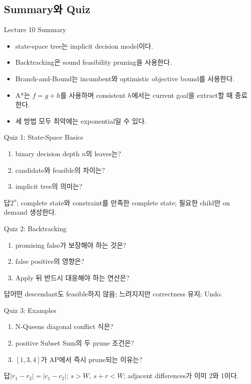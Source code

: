 \subsection{Summary와 Quiz}
\begin{frame}{Lecture 10 Summary}
\begin{itemize}
\item state-space tree는 implicit decision model이다.
\item Backtracking은 sound feasibility pruning을 사용한다.
\item Branch-and-Bound는 incumbent와 optimistic objective bound를 사용한다.
\item A*는 \(f=g+h\)를 사용하며 consistent \(h\)에서는 current goal을 extract할 때 종료한다.
\item 세 방법 모두 최악에는 exponential일 수 있다.
\end{itemize}
\end{frame}
\begin{frame}{Quiz 1: State-Space Basics}
\begin{enumerate}\item binary decision depth \(n\)의 leaves는?\item candidate와 feasible의 차이는?\item implicit tree의 의미는?\end{enumerate}
\begin{exampleblock}{답}\(2^n\); complete state와 constraint를 만족한 complete state; 필요한 child만 on demand 생성한다.\end{exampleblock}
\end{frame}
\begin{frame}{Quiz 2: Backtracking}
\begin{enumerate}\item promising false가 보장해야 하는 것은?\item false positive의 영향은?\item Apply 뒤 반드시 대응해야 하는 연산은?\end{enumerate}
\begin{exampleblock}{답}어떤 descendant도 feasible하지 않음; 느려지지만 correctness 유지; Undo.\end{exampleblock}
\end{frame}
\begin{frame}{Quiz 3: Examples}
\begin{enumerate}\item N-Queens diagonal conflict 식은?\item positive Subset Sum의 두 prune 조건은?\item \([1,3,4]\)가 AP에서 즉시 prune되는 이유는?\end{enumerate}
\begin{exampleblock}{답}\(|r_1-r_2|=|c_1-c_2|\); \(s>W\), \(s+r<W\); adjacent differences가 이미 2와 1이다.\end{exampleblock}
\end{frame}
